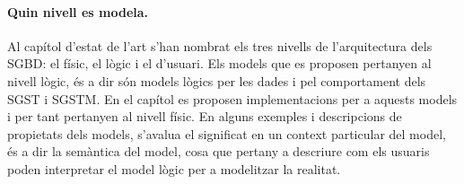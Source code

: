 






\paragraph{Quin nivell es modela.}
Al capítol d'estat de l'art s'han nombrat els tres nivells
de l'arquitectura dels \gls {SGBD}: el físic, el lògic i el d'usuari.
Els models que es proposen pertanyen al nivell lògic, és a dir són
models lògics per les dades i pel comportament dels \gls{SGST} i
\gls{SGSTM}. En el capítol  es proposen implementacions per
a aquests models i per tant pertanyen al nivell físic.  En alguns
exemples i descripcions de propietats dels models, s'avalua el
significat en un context particular del model, és a dir la semàntica
del model, cosa que pertany a descriure com els usuaris poden
interpretar el model lògic per a modelitzar la realitat.





